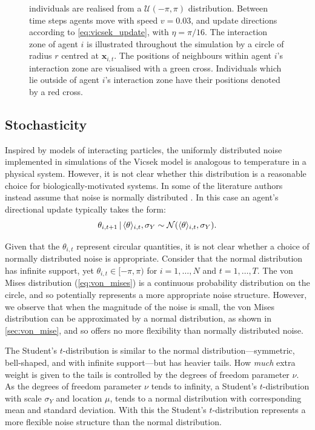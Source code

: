 \begin{figure}[tb]
{    individuals are realised from a $\mathcal{U}(-\pi, \pi)$ distribution.
    Between time steps agents move with speed $v=0.03$, and update
    directions according to \cref{eq:vicsek_update}, with $\eta=\pi/16$.
    The interaction zone of agent $i$ is illustrated throughout the
    simulation by a circle of radius $r$ centred at $\bm{x}_{i,t}$. The
    positions of neighbours within agent $i$'s interaction zone are
    visualised with a green cross. Individuals which lie outside of agent
    $i$'s interaction zone have their positions denoted by a red cross.}
  \label{fig:vicsek_illustration}
\end{figure}

\subsection{Stochasticity}

Inspired by models of interacting particles, the uniformly distributed noise
implemented in simulations of the Vicsek model is analogous to temperature in a
physical system. However, it is not clear whether this distribution is a
reasonable choice for biologically-motivated systems. In some of the literature
authors instead assume that noise is normally distributed \parencite{couzin02}.
In this case an agent's directional update typically takes the form:
\begin{equation*}
  \label{eq:normal_update}
  \theta_{i,t+1} \,|\, \langle\theta\rangle_{i,t}, \sigma_Y \sim
      \mathcal{N}(\langle\theta\rangle_{i,t}, \sigma_Y).
\end{equation*}

Given that the $\theta_{i,t}$ represent circular quantities, it is not clear
whether a choice of normally distributed noise is appropriate. Consider that
the normal distribution has infinite support, yet $\theta_{i,t}\in[-\pi,\pi)$
for $i=1,\ldots,N$ and $t=1,\ldots,T$. The von Mises distribution
(\cref{eq:von_mises}) is a continuous probability distribution on the circle,
and so potentially represents a more appropriate noise structure. However, we
observe that when the magnitude of the noise is small, the von Mises
distribution can be approximated by a normal distribution, as shown in
\cref{sec:von_mise}, and so offers no more flexibility than normally
distributed noise.

The Student's $t$-distribution is similar to the normal
distribution---symmetric, bell-shaped, and with infinite support---but has
heavier tails. How \emph{much} extra weight is given to the tails is controlled
by the degrees of freedom parameter $\nu$. As the degrees of freedom parameter
$\nu$ tends to infinity, a Student's $t$-distribution with scale $\sigma_Y$ and
location $\mu$, tends to a normal distribution with corresponding mean and
standard deviation. With this the Student's $t$-distribution represents a more
flexible noise structure than the normal distribution.

